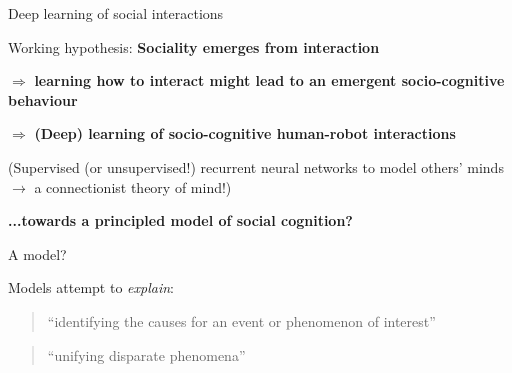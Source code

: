 \documentclass[compress]{beamer}
\begin{document}
\begin{frame}{Deep learning of social interactions}

    \large

    \begin{center}

    Working hypothesis: \textbf{Sociality emerges from interaction}


    \pause

    $\Rightarrow$ {\bf learning how to interact might lead to an emergent
    socio-cognitive behaviour}
   
    \pause

    $\Rightarrow$ {\bf (Deep) learning of socio-cognitive human-robot interactions}



    \normalsize

        (Supervised (or unsupervised!) recurrent neural networks to model others'
            minds $\rightarrow$ a connectionist theory of mind!)


    \pause
    \vspace{2em}
    {\bf ...towards a principled model of social cognition?}

    \end{center}

\end{frame}


{
\begin{frame}{A model?}

    Models attempt to \emph{explain}: 
    \begin{quote}
        ``identifying the causes for an event or phenomenon of interest''
    \end{quote}
    \begin{quote}
        ``unifying disparate phenomena''
    \end{quote}

\end{frame}
}






\end{document}
